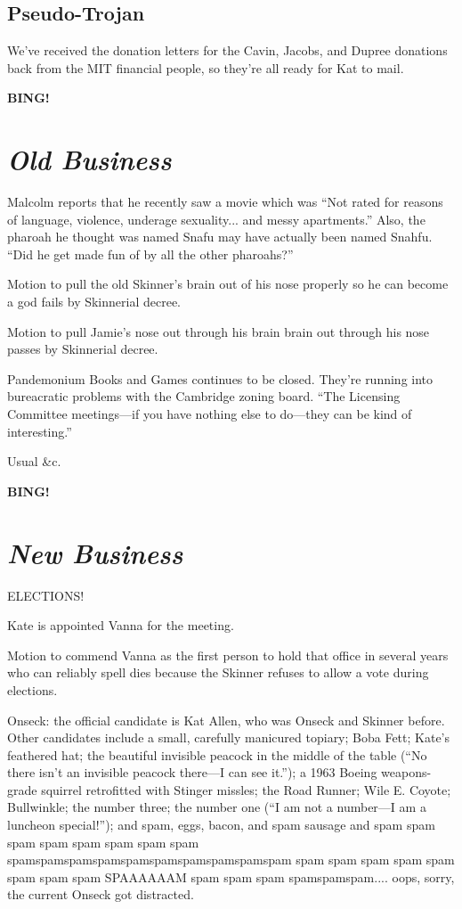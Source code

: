 \documentclass[10pt]{article}
\newcommand{\bing}{{\bf BING!} }
\newcommand{\goto}[1]{\bing \vskip 12pt \section*{{\em{#1}}}}
\begin{document}
\subsection*{Pseudo-Trojan}
We've received the donation letters for the Cavin, Jacobs, and Dupree donations back from the MIT
financial people, so they're all ready for Kat to mail.


\goto{Old Business}

Malcolm reports that he recently saw a movie which was ``Not rated for reasons of language, 
violence, underage sexuality... and messy apartments.''  Also, the pharoah he thought was named
Snafu may have actually been named Snahfu.  ``Did he get made fun of by all the other pharoahs?''

Motion to pull the old Skinner's brain out of his nose properly so he can become a god fails by
Skinnerial decree.

Motion to pull Jamie's {nose out through his brain} brain out through his nose passes by Skinnerial
decree.

Pandemonium Books and Games continues to be closed.  They're running into bureacratic problems 
with the Cambridge zoning board.  ``The Licensing Committee meetings---if you have nothing else to
do---they can be kind of interesting.''

Usual \&c.

\goto{New Business}

ELECTIONS!

Kate is appointed Vanna for the meeting.

Motion to commend Vanna as the first person to hold that office in several years who can reliably
spell dies because the Skinner refuses to allow a vote during elections.

Onseck: the official candidate is Kat Allen, who was Onseck and Skinner before.  Other candidates 
include a small, carefully manicured topiary; Boba Fett; Kate's feathered hat; the beautiful
invisible peacock in the middle of the table (``No there isn't an invisible peacock there---I can 
see it.''); a 1963 Boeing weapons-grade squirrel retrofitted with Stinger missles; the Road Runner;
Wile E. Coyote; Bullwinkle; the number three; the number one (``I am not a number---I am a luncheon
special!''); and spam, eggs, bacon, and spam sausage and spam spam spam spam spam spam spam spam 
spamspamspamspamspamspamspamspamspamspam spam spam spam spam spam spam spam spam SPAAAAAAM spam 
spam spam spamspamspam....  oops, sorry, the current Onseck got distracted.
\end{document}
